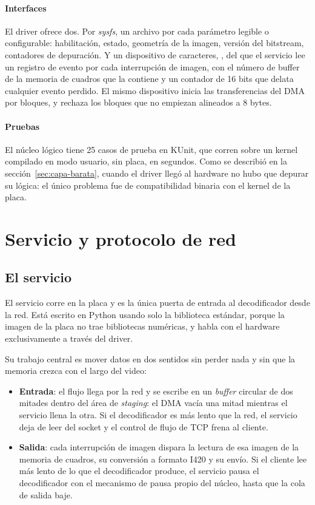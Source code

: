 \paragraph{Interfaces}
El driver ofrece dos. Por \emph{sysfs}, un archivo por cada parámetro
legible o configurable: habilitación, estado, geometría de la imagen,
versión del bitstream, contadores de depuración. Y un dispositivo de
caracteres, , del que el servicio lee un registro de
evento por cada interrupción de imagen, con el número de buffer de la
memoria de cuadros que la contiene y un contador de 16 bits que delata
cualquier evento perdido. El mismo dispositivo inicia las transferencias
del DMA por bloques, y rechaza los bloques que no empiezan alineados a 8
bytes.

\paragraph{Pruebas}
El núcleo lógico tiene 25 casos de prueba en KUnit, que corren sobre un
kernel compilado en modo usuario, sin placa, en segundos. Como se describió
en la sección~\ref{sec:capa-barata}, cuando el driver llegó al hardware no
hubo que depurar su lógica: el único problema fue de compatibilidad binaria
con el kernel de la placa.

\section{Servicio y protocolo de red}
\label{sec:daemon}

\subsection{El servicio }

El servicio corre en la placa y es la única puerta de entrada al
decodificador desde la red. Está escrito en Python usando solo la biblioteca
estándar, porque la imagen de la placa no trae bibliotecas numéricas, y
habla con el hardware exclusivamente a través del driver.

Su trabajo central es mover datos en dos sentidos sin perder nada y sin
que la memoria crezca con el largo del video:

\begin{itemize}
  \item \textbf{Entrada}: el flujo llega por la red y se escribe en un
    \emph{buffer} circular de dos mitades dentro del área de
    \emph{staging}: el DMA vacía una mitad mientras el servicio llena la
    otra. Si el decodificador es más lento que la red, el servicio deja de
    leer del socket y el control de flujo de TCP frena al cliente.
  \item \textbf{Salida}: cada interrupción de imagen dispara la lectura de
    esa imagen de la memoria de cuadros, su conversión a formato I420 y su
    envío. Si el cliente lee más lento de lo que el decodificador produce,
    el servicio pausa el decodificador con el mecanismo de pausa propio del
    núcleo, hasta que la cola de salida baje.
\end{itemize}

